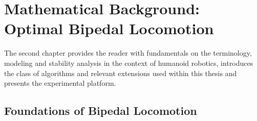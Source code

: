 
\chapter{Mathematical Background: Optimal Bipedal Locomotion}\label{c2}
The second chapter provides the reader with fundamentals on the terminology, modeling and stability analysis in the context of humanoid robotics, introduces the class of algorithms and relevant extensions used within this thesis and presents the experimental platform.  

\section{Foundations of Bipedal Locomotion}
